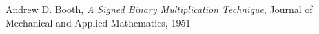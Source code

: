 \begin{thebibliography}{1}

Andrew D. Booth, \emph{A Signed Binary Multiplication Technique}, Journal of Mechanical and Applied Mathematics, 1951
%
%
\end{thebibliography}